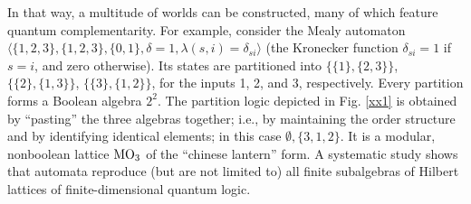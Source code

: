 \documentclass{llncs}
\begin{document}
In that way, a multitude of worlds can be constructed,
many of which feature quantum complementarity.
For example, consider the Mealy automaton
$\langle \{1,2,3\},\{1,2,3\},\{0,1\},\delta = 1 ,\lambda(s,i)=\delta_{si} \rangle$
(the Kronecker function $\delta_{si}=1$ if $s=i$, and zero otherwise).
Its states
are partitioned into
$
\{\{1\},\{2,3\}\}
$,
$
\{\{2\},\{1,3\}\}
$,
$
\{\{3\},\{1,2\}\}
$, for the inputs 1, 2, and 3, respectively.
Every partition forms a Boolean algebra $2^2$.
The partition logic depicted in Fig. \ref{xx1}
is obtained by ``pasting'' the three algebras together; i.e., by maintaining the order structure and by
identifying
identical elements; in this case $\emptyset,\{3,1,2\}$.
It is a modular, nonboolean lattice  ${\rm MO}_3$ of the ``chinese lantern'' form.
A systematic study \cite[pp.~38-39]{svozil-ql}
shows that automata reproduce (but are not limited to)
all finite subalgebras of Hilbert lattices of finite-dimensional quantum logic.
\end{document}
